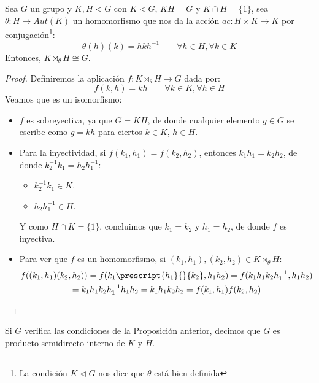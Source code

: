 \begin{prop}
    Sea $G$ un grupo y $K,H<G$ con $K\lhd G$, $KH = G$ y $K\cap H = \{1\}$, sea $\theta:H\to Aut(K)$ un homomorfismo que nos da la acción $ac:H\times K\to K$ por conjugación\footnote{La condición $K\lhd G$ nos dice que $\theta$ está bien definida}:
    \begin{equation*}
        \theta(h)(k) = hkh^{-1} \qquad \forall h\in H,\forall  k\in K
    \end{equation*}
    Entonces, $K\rtimes_\theta H \cong G$.
    \begin{proof}
        Definiremos la aplicación $f:K\rtimes_\theta H \to G$ dada por:
        \begin{equation*}
            f(k,h) = kh \qquad \forall k\in K, \forall h\in H
        \end{equation*}
        Veamos que es un isomorfismo:
        \begin{itemize}
            \item $f$ es sobreyectiva, ya que $G = KH$, de donde cualquier elemento $g\in G$ se escribe como $g = kh$  para ciertos $k\in K$, $h\in H$.
            \item Para la inyectividad, si $f(k_1,h_1) = f(k_2,h_2)$, entonces $k_1h_1 = k_2h_2$, de donde $k_2^{-1}k_1=h_2h_1^{-1}$:
                \begin{itemize}
                    \item $k_2^{-1}k_1\in K$.
                    \item $h_2h_1^{-1}\in H$.
                \end{itemize}
                Y como $H\cap K = \{1\}$, concluimos que $k_1 = k_2$ y $h_1 = h_2$, de donde $f$ es inyectiva.
            \item Para ver que $f$ es un homomorfismo, si $(k_1,h_1),(k_2,h_2)\in K\rtimes_\theta H$:
                \begin{multline*}
                    f((k_1,h_1)(k_2,h_2)) = f(k_1\prescript{h_1}{}{k_2},h_1h_2) = f(k_1h_1k_2h_1^{-1},h_1h_2) \\ = k_1h_1k_2h_1^{-1}h_1h_2 = k_1h_1k_2h_2 = f(k_1,h_1)f(k_2,h_2)
                \end{multline*}
        \end{itemize}
    \end{proof}
\end{prop}

\begin{definicion}
    Si $G$ verifica las condiciones de la Proposición anterior, decimos que $G$ es producto semidirecto interno de $K$ y $H$.
\end{definicion}

